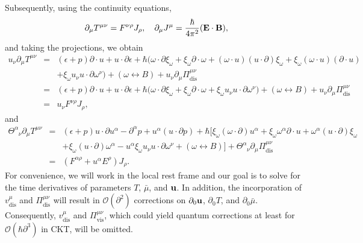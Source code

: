 \documentclass[aps,prd,showkeys,preprint,amsmath,amssymb,nofootinbib]{revtex4-1}
\begin{document}
Subsequently, using the continuity equations,
\begin{eqnarray}\label{conti_eq}
\partial_{\mu}T^{\mu\nu}=F^{\nu\rho}J_{\rho},\quad \partial_{\mu}J^{\mu}=\frac{\hbar}{4\pi^2}({\bf E\cdot B}),
\end{eqnarray}
and taking the projections, we obtain
\begin{eqnarray}\nonumber \label{de0}
u_{\nu}\partial_{\mu}T^{\mu\nu}&=&(\epsilon+p)\partial\cdot u+u\cdot\partial \epsilon
+\hbar\big(\omega\cdot\partial\xi_{\omega}+\xi_{\omega}\partial\cdot\omega
+(\omega\cdot u)(u\cdot\partial)\xi_{\omega}+\xi_{\omega}(\omega\cdot u)(\partial\cdot u)
\\\nonumber
&&
+\xi_{\omega}u_{\nu}u\cdot\partial\omega^{\nu}
\big)
+(\omega\leftrightarrow B)+u_{\nu}\partial_{\mu}\Pi^{\mu\nu}_\text{dis}
\\\nonumber
&=&(\epsilon+p)\partial\cdot u+u\cdot\partial \epsilon
+\hbar\big(\omega\cdot\partial\xi_{\omega}+\xi_{\omega}\partial\cdot\omega
+\xi_{\omega}u_{\nu}u\cdot\partial\omega^{\nu}
\big)+(\omega\leftrightarrow B)+u_{\nu}\partial_{\mu}\Pi^{\mu\nu}_\text{dis}
\\
&=&u_{\nu}F^{\nu\rho}J_{\rho},
\end{eqnarray}
and
\begin{eqnarray}\nonumber
\Theta^{\alpha}_{\mbox{ }\nu}\partial_{\mu}T^{\mu\nu}&=&(\epsilon+p)u\cdot\partial u^{\alpha}
-\partial^{\alpha}p+u^{\alpha}(u\cdot\partial p)+
\hbar\big[\xi_{\omega}(\omega\cdot\partial)u^{\alpha}+\xi_{\omega}\omega^{\alpha}\partial\cdot u+\omega^{\alpha}(u\cdot\partial)\xi_{\omega}
\\\nonumber
&&+\xi_{\omega}(u\cdot\partial)\omega^{\alpha}-u^{\alpha}\xi_{\omega}u_{\nu}u\cdot\partial\omega^{\nu}
+(\omega\leftrightarrow B)
\big]+\Theta^{\alpha}_{\mbox{ }\nu}\partial_{\mu}\Pi^{\mu\nu}_\text{dis}
\\
&=&(F^{\alpha\rho}+u^{\alpha}E^{\rho})J_{\rho}. \label{delta_TEM}
\end{eqnarray}
For convenience, we will work in the local rest frame and our goal is to solve for the time derivatives of parameters $T$, $\bar{\mu}$, and ${\bf u}$. In addition, the incorporation of 
$v^{\mu}_\text{dis}$ and $\Pi^{\mu\nu}_\text{dis}$ 
will result in $\mathcal{O}(\partial^2)$ corrections on $\partial_0{\bf u}$, $\partial_0T$, and $\partial_0\bar{\mu}$. Consequently, 
$v^{\mu}_\text{dis}$ and $\Pi^{\mu\nu}_\text{vis}$, 
which could yield quantum corrections at least for $\mathcal{O}(\hbar\partial^3)$ in CKT, will be omitted.
\end{document}
